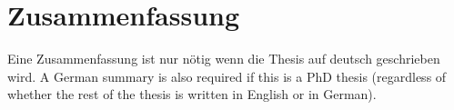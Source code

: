 \chapter*{Zusammenfassung}

Eine Zusammenfassung ist nur nötig wenn die Thesis auf deutsch geschrieben 
wird.
A German summary is also required if this is a PhD thesis (regardless of whether the rest of the thesis is written in English or in German).
